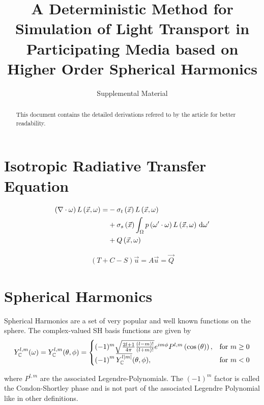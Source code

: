 \documentclass[10pt]{scrartcl}
\title{A Deterministic Method for Simulation of Light Transport in Participating Media based on Higher Order Spherical Harmonics}
\subtitle{Supplemental Material}
\date{}
\begin{document}
%
\maketitle
\begin{abstract}
This document contains the detailed derivations refered to by the article for better readability.
\end{abstract}
\tableofcontents



\section{Isotropic Radiative Transfer Equation}

\begin{align}
\left(\nabla\cdot\omega\right)L\left(\vec{x}, \omega \right)
=&
-\sigma_t\left(\vec{x}\right) L\left(\vec{x}, \omega \right)\nonumber\\
&
+\sigma_s\left(\vec{x}\right) \int_{\Omega}
{
p\left(\omega'\cdot\omega\right)L\left(\vec{x}, \omega \right)\,\mathrm{d}\omega'
}\nonumber\\
&
+Q\left(\vec{x}, \omega\right)\nonumber
\end{align}

\begin{align}
(T+C-S)\vec{u} = A\vec{u} = \vec{Q}
\end{align}

\section{Spherical Harmonics}

Spherical Harmonics are a set of very popular and well known functions on the sphere. The complex-valued SH basis functions are given by
\begin{align}
Y_{\mathbb{C}}^{l,m}(\omega) = Y_{\mathbb{C}}^{l,m}(\theta, \phi)=
\begin{cases}
(-1)^m\sqrt{\frac{2l+1}{4\pi}\frac{(l-m)!}{(l+m)!}}e^{im\phi}P^{l,m}\left(\operatorname{cos}\left(\theta\right)\right), & \text{for $m\ge0$}\\
\left(-1\right)^m\overline{Y_{\mathbb{C}}^{l\left|m\right|}}(\theta, \phi), & \text{for $m<0$}
\end{cases}
\end{align}

where $P^{l,m}$ are the associated Legendre-Polynomials. The $\left(-1\right)^m$ factor is called the Condon-Shortley phase and is not part of the associated Legendre Polynomial like in other definitions.
\end{document}
